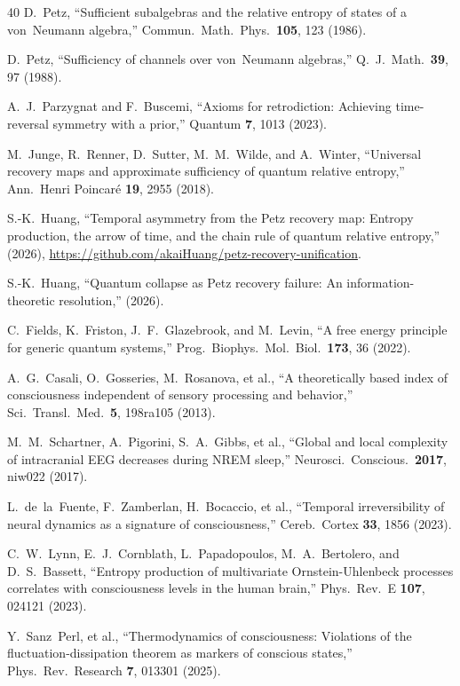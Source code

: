 \documentclass[prl,twocolumn,superscriptaddress,longbibliography,floatfix]{revtex4-2}
\begin{document}
\begin{thebibliography}{40}
D.~Petz,
``Sufficient subalgebras and the relative entropy of states of a
von~Neumann algebra,''
Commun.\ Math.\ Phys.\ \textbf{105}, 123 (1986).

D.~Petz,
``Sufficiency of channels over von~Neumann algebras,''
Q.\ J.\ Math.\ \textbf{39}, 97 (1988).

A.~J.~Parzygnat and F.~Buscemi,
``Axioms for retrodiction: Achieving time-reversal symmetry with
a prior,''
Quantum \textbf{7}, 1013 (2023).

M.~Junge, R.~Renner, D.~Sutter, M.~M.~Wilde, and A.~Winter,
``Universal recovery maps and approximate sufficiency of quantum
relative entropy,''
Ann.\ Henri Poincar\'{e} \textbf{19}, 2955 (2018).

S.-K.~Huang,
``Temporal asymmetry from the Petz recovery map: Entropy production,
the arrow of time, and the chain rule of quantum relative entropy,''
(2026), \url{https://github.com/akaiHuang/petz-recovery-unification}.

S.-K.~Huang,
``Quantum collapse as Petz recovery failure: An information-theoretic
resolution,''
(2026).

C.~Fields, K.~Friston, J.~F.~Glazebrook, and M.~Levin,
``A free energy principle for generic quantum systems,''
Prog.\ Biophys.\ Mol.\ Biol.\ \textbf{173}, 36 (2022).

A.~G.~Casali, O.~Gosseries, M.~Rosanova, et al.,
``A theoretically based index of consciousness independent of
sensory processing and behavior,''
Sci.\ Transl.\ Med.\ \textbf{5}, 198ra105 (2013).

M.~M.~Schartner, A.~Pigorini, S.~A.~Gibbs, et al.,
``Global and local complexity of intracranial EEG decreases during
NREM sleep,''
Neurosci.\ Conscious.\ \textbf{2017}, niw022 (2017).

L.~de~la~Fuente, F.~Zamberlan, H.~Bocaccio, et al.,
``Temporal irreversibility of neural dynamics as a signature of
consciousness,''
Cereb.\ Cortex \textbf{33}, 1856 (2023).

C.~W.~Lynn, E.~J.~Cornblath, L.~Papadopoulos, M.~A.~Bertolero,
and D.~S.~Bassett,
``Entropy production of multivariate Ornstein-Uhlenbeck processes
correlates with consciousness levels in the human brain,''
Phys.\ Rev.\ E \textbf{107}, 024121 (2023).

Y.~Sanz~Perl, et al.,
``Thermodynamics of consciousness: Violations of the
fluctuation-dissipation theorem as markers of conscious states,''
Phys.\ Rev.\ Research \textbf{7}, 013301 (2025).


\end{thebibliography}
\end{document}
